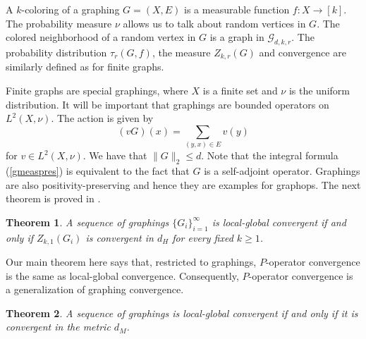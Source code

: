 \documentclass[a4wider]{amsart}
\newtheorem{theorem}{Theorem}[section]
\theoremstyle{definitionbreak}\newtheorem{D}[theorem]{Definition}
\theoremstyle{definitionbreak}\newtheorem*{D*}{Definition}
\begin{document}
A $k$-coloring of a graphing $G=(X,E)$ is a measurable function $f:X\to [k]$. The probability measure $\nu$ allows us to talk about random vertices in $G$. The colored neighborhood of a random vertex in $G$ is a graph in $\mathcal{G}_{d,k,r}$. The probability distribution $\tau_r(G,f)$, the  measure  $Z_{k,r}(G)$ and convergence are similarly defined as for finite graphs. 

 Finite graphs are special graphings, where $X$ is a finite set and $\nu$ is the uniform distribution.
It will be important that graphings are bounded operators on $L^2(X,\nu)$. The action is given by $$(vG)(x)=\sum_{(y,x)\in E}v(y)$$ for $v\in L^2(X,\nu)$. We have that $\|G\|_2\leq d$. Note that the integral formula (\ref{gmeaspres}) is equivalent to the fact that $G$ is a self-adjoint operator. Graphings are also positivity-preserving and hence they are examples for graphops. The next theorem is proved in \cite{star}. 

\begin{theorem}\label{starconv} A sequence of graphings $\{G_i\}_{i=1}^\infty$ is local-global convergent if and only if $Z_{k,1}(G_i)$ is convergent in $d_H$ for every fixed $k\geq 1$.
\end{theorem}

Our main theorem here says that, restricted to graphings, $P$-operator convergence is the same as local-global convergence. Consequently, $P$-operator convergence is a generalization of graphing convergence.

\begin{theorem}\label{locglobeq} A sequence of graphings is local-global convergent if and only if it is convergent in the metric $d_M$.
\end{theorem}
\end{document}
